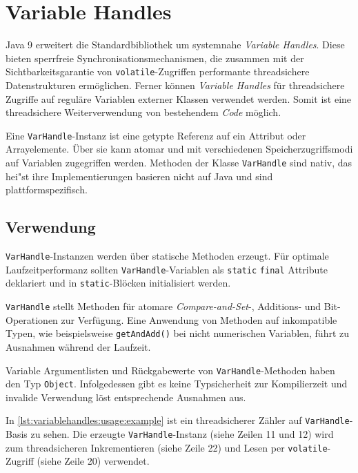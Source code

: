 \documentclass[a4paper, 11pt]{article}
\begin{document}
\section{Variable Handles}
\label{sec:variablehandles}

Java 9 erweitert die Standardbibliothek um systemnahe \textit{Variable Handles}\autocite{javadoc:varhandle}.
Diese bieten sperrfreie Synchronisationsmechanismen, die zusammen mit der Sichtbarkeitsgarantie von \verb|volatile|-Zugriffen performante threadsichere Datenstrukturen ermöglichen.
Ferner können \textit{Variable Handles} für threadsichere Zugriffe auf reguläre Variablen externer Klassen verwendet werden.
Somit ist eine threadsichere Weiterverwendung von bestehendem \textit{Code} möglich.

Eine \verb|VarHandle|-Instanz ist eine getypte Referenz auf ein Attribut oder Arrayelemente.
Über sie kann atomar und mit verschiedenen Speicherzugriffsmodi auf Variablen zugegriffen werden.
Methoden der Klasse \verb|VarHandle| sind nativ, das hei"st ihre Implementierungen basieren nicht auf Java und sind plattformspezifisch.

\subsection{Verwendung}
\label{subsec:variablehandles:usage}

\verb|VarHandle|-Instanzen werden über statische Methoden erzeugt.
Für optimale Laufzeitperformanz sollten \verb|VarHandle|-Variablen als \verb|static| \verb|final| Attribute deklariert und in \verb|static|-Blöcken initialisiert werden\autocite{jep193}.

\verb|VarHandle| stellt Methoden für atomare \textit{Compare-and-Set}-, Additions- und Bit-Operationen zur Verfügung.
Eine Anwendung von Methoden auf inkompatible Typen, wie beispielsweise \verb|getAndAdd()| bei nicht numerischen Variablen, führt zu Ausnahmen während der Laufzeit.

Variable Argumentlisten und Rückgabewerte von \verb|VarHandle|-Methoden haben den Typ \verb|Object|.
Infolgedessen gibt es keine Typsicherheit zur Kompilierzeit und invalide Verwendung löst entsprechende Ausnahmen aus.

In \autoref{lst:variablehandles:usage:example} ist ein threadsicherer Zähler auf \verb|VarHandle|-Basis zu sehen.
Die erzeugte \verb|VarHandle|-Instanz (siehe Zeilen 11 und 12) wird zum threadsicheren Inkrementieren (siehe Zeile 22) und Lesen per \verb|volatile|-Zugriff (siehe Zeile 20) verwendet.
\end{document}
